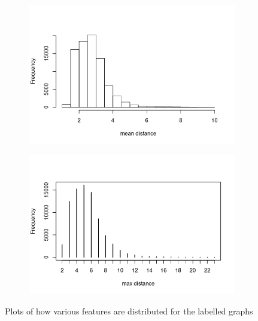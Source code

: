\documentclass{l4proj}
\theoremstyle{definition}
\theoremstyle{remark}
\begin{document}
\begin{figure}
\begin{subfigure}[t]{0.49\textwidth}
  \end{subfigure}
  \begin{subfigure}[t]{0.49\textwidth}
    \centering
    \includegraphics[width=\textwidth]{images/mcs_meandist.png}
  \end{subfigure}
  \begin{subfigure}[t]{0.49\textwidth}
    \centering
    \includegraphics[width=\textwidth]{images/mcs_maxdist.png}
  \end{subfigure}
  \caption{Plots of how various features are distributed for the labelled graphs}
  \label{fig:mcs_features1}
\end{figure}
\end{document}
